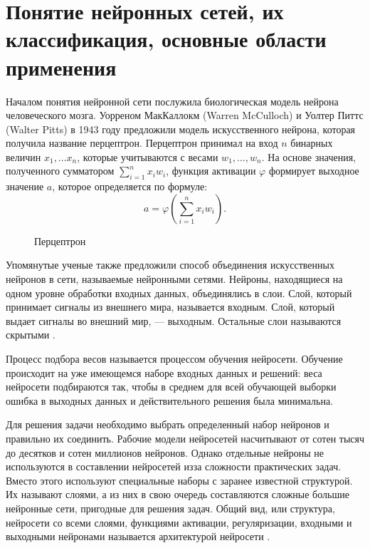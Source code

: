 \chapter{Понятие нейронных сетей, их классификация, основные области применения}
Началом понятия нейронной сети послужила биологическая модель нейрона человеческого мозга.
Уорреном МакКаллокм (Warren McCulloch) и Уолтер Питтс (Walter Pitts) в 1943 году предложили
модель искусственного нейрона, которая получила название перцептрон. Перцептрон принимал на вход $n$ бинарных величин $x_1, \dots x_n$,
которые учитываются с весами $w_1, \dots, w_n$. На основе значения, полученного сумматором $\sum_{i=1}^n x_i w_i$, функция активации
$\varphi$ формирует выходное значение $a$, которое определяется по формуле:
\begin{equation}
    a = \varphi \left( \sum\limits_{i=1}^n x_i w_i \right).
\end{equation}

\begin{figure}[H]
	\caption{Перцептрон}
\end{figure}

Упомянутые ученые также предложили способ объединения искусственных нейронов в сети, называемые нейронными сетями.
Нейроны, находящиеся на одном уровне обработки входных данных, объединялись в слои.
Слой, который принимает сигналы из внешнего мира, называется входным. Слой, который выдает сигналы во внешний мир, —
выходным. Остальные слои называются скрытыми \cite{sozykin}.

Процесс подбора весов называется процессом обучения нейросети.
Обучение происходит на уже имеющемся наборе входных данных и
решений: веса нейросети подбираются так, чтобы в среднем для всей
обучающей выборки ошибка в выходных данных и действительного
решения была минимальна.

Для решения задачи необходимо выбрать определенный набор
нейронов и правильно их соединить. Рабочие модели нейросетей
насчитывают от сотен тысяч до десятков и сотен миллионов нейронов.
Однако отдельные нейроны не используются в составлении нейросетей изза сложности практических задач. Вместо этого используют специальные
наборы с заранее известной структурой. Их называют слоями, а из них в
свою очередь составляются сложные большие нейронные сети, пригодные
для решения задач. Общий вид, или структура, нейросети со всеми слоями,
функциями активации, регуляризации, входными и выходными нейронами
называется архитектурой нейросети \cite{cyber_alex}.


